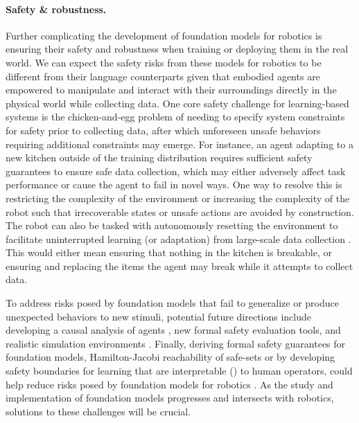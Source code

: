 \paragraph{Safety \& robustness.} Further complicating the development of foundation models for robotics is ensuring their safety and robustness when training or deploying them in the real world. We can expect the safety risks from these models for robotics to be different from their language counterparts given that embodied agents are empowered to manipulate and interact with their surroundings directly in the physical world while collecting data. One core safety challenge for learning-based systems is the chicken-and-egg problem of needing to specify system constraints for safety prior to collecting data, after which unforeseen unsafe behaviors requiring additional constraints may emerge. For instance, an agent adapting to a new kitchen outside of the training distribution requires sufficient safety guarantees to ensure safe data collection, which may either adversely affect task performance or cause the agent to fail in novel ways. One way to resolve this is restricting the complexity of the environment or increasing the complexity of the robot such that irrecoverable states or unsafe actions are avoided by construction. The robot can also be tasked with autonomously resetting the environment to facilitate uninterrupted learning (or adaptation) from large-scale data collection \citep{eysenbach2017leave, gupta2021reset}. This would either mean ensuring that nothing in the kitchen is breakable, or ensuring and replacing the items the agent may break while it attempts to collect data.

To address risks posed by foundation models that fail to generalize or produce unexpected behaviors to new stimuli, potential future directions include developing a causal analysis of agents \citep{deletang2021causal}, new formal safety evaluation tools, and realistic simulation environments \citep{corso2020survey, dreossi2017compositional, Julian_2019}. Finally, deriving formal safety guarantees for foundation models, \eg Hamilton-Jacobi reachability of safe-sets \citep{chow2018lyapunov, fisac2019bridging, herbert2021scalable} or by developing safety boundaries for learning that are interpretable () to human operators, could help reduce risks posed by foundation models for robotics \citep{berkenkamp2017safe}. As the study and implementation of foundation models progresses and intersects with robotics, solutions to these challenges will be crucial.

